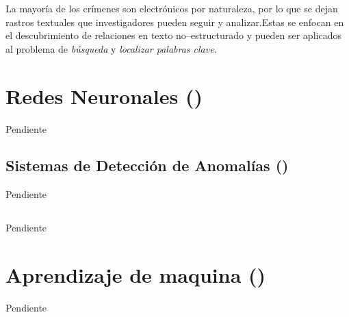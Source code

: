 La mayoría de los crímenes son electrónicos por naturaleza, por lo que se dejan rastros textuales que investigadores pueden seguir y analizar.Estas se enfocan en el descubrimiento de relaciones en texto no--estructurado y pueden ser aplicados al problema de \emph{búsqueda} y \emph{localizar palabras clave}.


\section{Redes Neuronales ()} \label{secNN}
Pendiente

\subsection{Sistemas de Detección de Anomalías ()}
Pendiente

\subsection{}
Pendiente


\section{Aprendizaje de maquina ()} \label{secML}
Pendiente